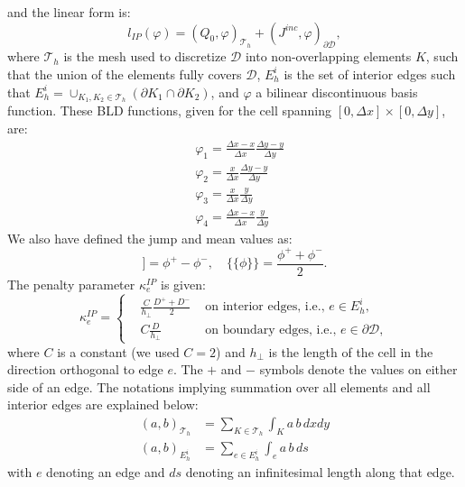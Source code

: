 \documentclass{mc2013}
\newcommand{\jmp}[1]{[\![#1]\!]}                     %
\newcommand{\mvl}[1]{\{\!\!\{#1\}\!\!\}}             %
\newcommand\tf{\varphi}
\newcommand\mc{\mathcal}
\renewcommand{\(}{\left(}
\renewcommand{\)}{\right)}
\renewcommand{\[}{\left[}
\renewcommand{\]}{\right]}
\begin{document}
and the linear form is:
\begin{equation}
\label{eq:rhs-ip-form}
  l_{IP}(\tf) = \(Q_0,\tf\)_{\mc{T}_h} + (J^{inc},\tf)_{\partial \mc{D}},
\end{equation}
%
%
where $\mc{T}_h$ is the mesh used to discretize $\mc{D}$ into non-overlapping 
elements $K$, such that the union of the elements fully covers $\mc{D}$, $E_h^i$ is 
the set of interior edges such that $E_h^i= \cup _{K_1,K_2\in \mc{T}_h}(\partial K_1 \cap \partial K_2)$,
and $\tf$ a bilinear discontinuous basis function. These BLD functions, given for the cell spanning 
$[0,{\Delta x}]\times[0, \Delta y]$, are:
\begin{align*}
& \tf_1 = \frac{{\Delta x}-x}{{\Delta x}}\frac{\Delta y-y}{\Delta y}\\
& \tf_2 = \frac{x}{{\Delta x}} \frac{\Delta y-y}{\Delta y}\\
& \tf_3 = \frac{x}{{\Delta x}}\frac{y}{\Delta y}\\
& \tf_4 = \frac{{\Delta x}-x}{{\Delta x}}\frac{y}{\Delta y}
\end{align*}
We also have defined the jump and mean values as:
\begin{equation}
  \jmp{\phi} = \phi^+ - \phi^-,\quad
  \mvl{\phi} =  \frac{\phi^++\phi^-}{2}.
\end{equation}
The penalty parameter $\kappa_e^{IP}$ is given:
\begin{equation}
\label{eq:penalty-ip}
  \kappa_e^{IP} = \left\{
    \begin{aligned}
      & \frac{C}{h_{\bot}} \frac{D^+ +D^-}{2} & \textrm{ on interior edges, i.e., } e \in  E_h^i,\\
      & C\frac{D}{h_{\bot}} & \textrm{ on boundary edges, i.e., } e \in \partial \mc{D},
    \end{aligned}
    \right.
\end{equation}
where $C$ is a constant (we used $C=2$) and $h_{\bot}$ is the
length of the cell in the direction orthogonal to edge $e$.  The $+$ and $-$
symbols denote the values on either side of an edge. 
The notations implying summation over all elements and all interior edges are explained below: 
\begin{align*}
\(a,b\)_{\mc{T}_h} &= \sum_{K \in \mc{T}_h } \int_K a\,b\,dxdy \\
\(a,b\)_{E_h^i}    &= \sum_{e \in E_h^i } \int_e a\,b \,ds
\end{align*}
with $e$ denoting an edge and $ds$ denoting an infinitesimal length along that edge.\\
\end{document}
